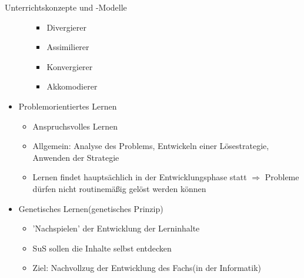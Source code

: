 \documentclass{article}
\begin{document}
\begin{block}{Unterrichtskonzepte und -Modelle}
\begin{itemize}
\begin{itemize}
            \begin{itemize}
                \item Divergierer
                \item Assimilierer
                \item Konvergierer
                \item Akkomodierer
            \end{itemize}
        \end{itemize}
        \item Problemorientiertes Lernen
        \begin{itemize}
            \item Anspruchsvolles Lernen
            \item Allgemein: Analyse des Problems, Entwickeln einer Lösestrategie, Anwenden der Strategie
            \item Lernen findet hauptsächlich in der Entwicklungsphase statt $\Rightarrow$ Probleme dürfen nicht routinemäßig gelöst werden können
        \end{itemize}
        \item Genetisches Lernen(genetisches Prinzip)
        \begin{itemize}
            \item 'Nachspielen' der Entwicklung der Lerninhalte
            \item SuS sollen die Inhalte selbst entdecken
            \item Ziel: Nachvollzug der Entwicklung des Fachs(in der Informatik)
        \end{itemize}
    \end{itemize}
\end{block}
\end{document}
